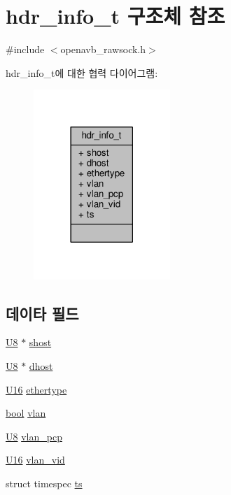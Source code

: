 \hypertarget{structhdr__info__t}{}\section{hdr\+\_\+info\+\_\+t 구조체 참조}
\label{structhdr__info__t}


{\ttfamily \#include $<$openavb\+\_\+rawsock.\+h$>$}



hdr\+\_\+info\+\_\+t에 대한 협력 다이어그램\+:
\nopagebreak
\begin{figure}[H]
\begin{center}
\leavevmode
\includegraphics[width=146pt]{structhdr__info__t__coll__graph}
\end{center}
\end{figure}
\subsection*{데이타 필드}
\begin{DoxyCompactItemize}
\item 
\hyperlink{openavb__types__base__pub_8h_aa63ef7b996d5487ce35a5a66601f3e73}{U8} $\ast$ \hyperlink{structhdr__info__t_a603b5aebe0d4619ae32b09cd6612535f}{shost}
\item 
\hyperlink{openavb__types__base__pub_8h_aa63ef7b996d5487ce35a5a66601f3e73}{U8} $\ast$ \hyperlink{structhdr__info__t_a5a0b8fa2025e75a8db03f7a23cadc04e}{dhost}
\item 
\hyperlink{openavb__types__base__pub_8h_a0a0a322d5fa4a546d293a77ba8b4a71f}{U16} \hyperlink{structhdr__info__t_a54283e441ba9b75fc494232121266e2c}{ethertype}
\item 
\hyperlink{avb__gptp_8h_af6a258d8f3ee5206d682d799316314b1}{bool} \hyperlink{structhdr__info__t_aae65321fd27fc2507a499a3f00660a93}{vlan}
\item 
\hyperlink{openavb__types__base__pub_8h_aa63ef7b996d5487ce35a5a66601f3e73}{U8} \hyperlink{structhdr__info__t_a394deccdf47e8dd6b4e6329e6fe0f8fc}{vlan\+\_\+pcp}
\item 
\hyperlink{openavb__types__base__pub_8h_a0a0a322d5fa4a546d293a77ba8b4a71f}{U16} \hyperlink{structhdr__info__t_aed62b55d4664ac7c198517a01adc4f6b}{vlan\+\_\+vid}
\item 
struct timespec \hyperlink{structhdr__info__t_ad7bf7613b53788b73c72e70d5335e7c8}{ts}
\end{DoxyCompactItemize}


